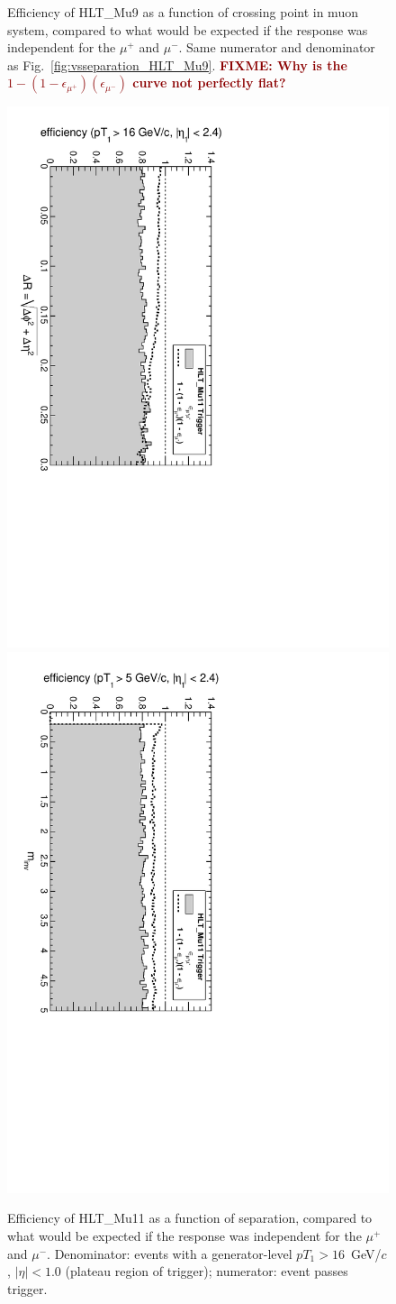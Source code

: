 \documentclass[12pt]{article}
\newcommand{\fixme}[1]{\textcolor{darkred}{\bf FIXME: #1}}
\begin{document}
\begin{figure}[p]
\caption{Efficiency of HLT\_Mu9 as a function of crossing point in
  muon system, compared to what would be expected if the response was
  independent for the $\mu^+$ and $\mu^-$.  Same numerator and
  denominator as Fig.~\ref{fig:vsseparation_HLT_Mu9}.  \fixme{Why is
    the $1 - (1 - \epsilon_{\mu^+})(\epsilon_{\mu^-})$ curve not
    perfectly flat?}  \label{fig:vsmuonpos_HLT_Mu9}}
\end{figure}

\begin{figure}[p]
\includegraphics[height=0.5\linewidth, angle=90]{fig/acceptance6_plot/vsdR_HLT_Mu11.pdf}
\includegraphics[height=0.5\linewidth, angle=90]{fig/acceptance6_plot/vsmass_HLT_Mu11.pdf}

\caption{Efficiency of HLT\_Mu11 as a function of separation, compared to what would be expected if the response was independent for the $\mu^+$ and $\mu^-$.  Denominator: events with a
  generator-level $pT_1 > 16$~GeV/$c$, $|\eta| < 1.0$ (plateau region
  of trigger); numerator: event passes trigger. \label{fig:vsseparation_HLT_Mu11}}
\end{figure}
\end{document}
